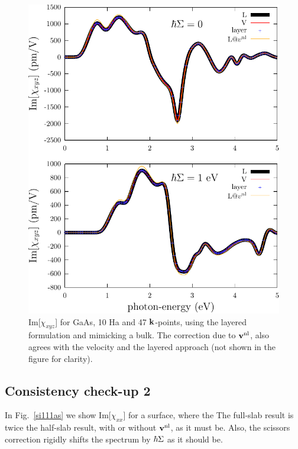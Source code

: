 \begin{figure}[b]
\centering
\includegraphics[scale=.7]{plots/shg-bulk}
\caption{Im[$\chi_{xyz}$] for GaAs, 10 Ha and 47 $\mathbf{k}$-points, using
  the layered formulation and mimicking a bulk. 
The correction
  due to $\mathbf{v}^{\mathrm{nl}}$, also agrees with the velocity and the layered
  approach (not shown in the figure for clarity).}
\label{gaas}
\end{figure}


\subsection{Consistency check-up 2}

In Fig.~\ref{si111as} we show
Im[$\chi_{xx}$] for a surface, where the 
The full-slab result is twice the half-slab
result, with or without $\mathbf{v}^{\mathrm{nl}}$,  as it must be. Also, the scissors
correction rigidly shifts the spectrum by $\hbar\Sigma$ as it should be.  

